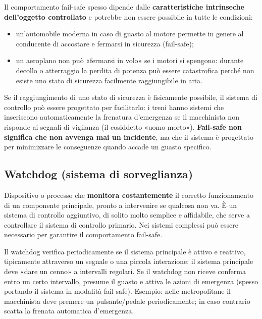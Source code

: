 Il comportamento fail-safe spesso dipende dalle \textbf{caratteristiche intrinseche dell'oggetto controllato} e potrebbe non essere possibile in tutte le condizioni:
\begin{itemize}
    \item un'automobile moderna in caso di guasto al motore permette in genere al conducente di accostare e fermarsi in sicurezza (fail-safe);
    \item un aeroplano non può «fermarsi in volo» se i motori si spengono: durante decollo o atterraggio la perdita di potenza può essere catastrofica perché non esiste uno stato di sicurezza facilmente raggiungibile in aria.
\end{itemize}

Se il raggiungimento di uno stato di sicurezza è fisicamente possibile, il sistema di controllo può essere progettato per facilitarlo: i treni hanno sistemi che inseriscono automaticamente la frenatura d'emergenza se il macchinista non risponde ai segnali di vigilanza (il cosiddetto «uomo morto»). \textbf{Fail-safe non significa che non avvenga mai un incidente}, ma che il sistema è progettato per minimizzare le conseguenze quando accade un guasto specifico.

\subsection{Watchdog (sistema di sorveglianza)}
\begin{defn}[Watchdog]
Dispositivo o processo che \textbf{monitora costantemente} il corretto funzionamento di un componente principale, pronto a intervenire se qualcosa non va. È un sistema di controllo aggiuntivo, di solito molto semplice e affidabile, che serve a controllare il sistema di controllo primario. Nei sistemi complessi può essere necessario per garantire il comportamento fail-safe.
\end{defn}
Il watchdog verifica periodicamente se il sistema principale è attivo e reattivo, tipicamente attraverso un segnale o una piccola interazione: il sistema principale deve «dare un cenno» a intervalli regolari. Se il watchdog non riceve conferma entro un certo intervallo, presume il guasto e attiva le azioni di emergenza (spesso portando il sistema in modalità fail-safe). Esempio: nelle metropolitane il macchinista deve premere un pulsante/pedale periodicamente; in caso contrario scatta la frenata automatica d'emergenza.

